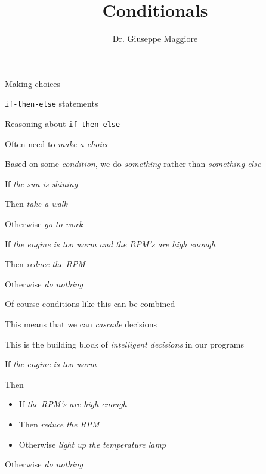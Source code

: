 \documentclass{beamer}
\title{Conditionals}
\author{Dr. Giuseppe Maggiore}
\institute{Hogeschool Rotterdam \\ 
Rotterdam, Netherlands}
\date{}
\begin{document}
\maketitle

\begin{slide}{
\item Making choices
\item \texttt{if-then-else} statements
\item Reasoning about \texttt{if-then-else}
}\end{slide}

\begin{slide}{
\item Often need to \textit{make a choice}
\item Based on some \textit{condition}, we do \textit{something} rather than \textit{something else}
}\end{slide}

\begin{slide}{
\item If \textit{the sun is shining}
\item Then \textit{take a walk}
\item Otherwise \textit{go to work}
}\end{slide}

\begin{slide}{
\item If \textit{the engine is too warm and the RPM's are high enough}
\item Then \textit{reduce the RPM}
\item Otherwise \textit{do nothing}
}\end{slide}

\begin{slide}{
\item Of course conditions like this can be combined
\item This means that we can \textit{cascade} decisions
\item This is the building block of \textit{intelligent decisions} in our programs
}\end{slide}

\begin{slide}{
\item If \textit{the engine is too warm}
\item Then
\begin{itemize}
\item If \textit{the RPM's are high enough}
\item Then \textit{reduce the RPM}
\item Otherwise \textit{light up the temperature lamp}
\end{itemize}
\item Otherwise \textit{do nothing}
}\end{slide}
\end{document}
